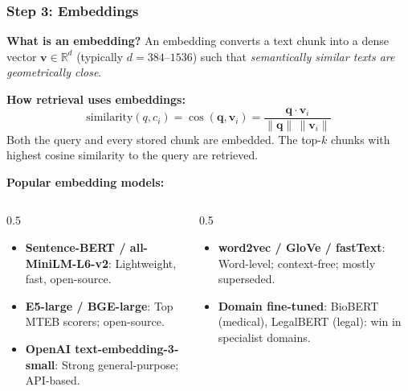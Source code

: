 \begin{frame}[fragile]\frametitle{Step 3: Embeddings}

\textbf{What is an embedding?}
An embedding converts a text chunk into a dense vector $\mathbf{v} \in \mathbb{R}^d$ (typically $d = 384$--$1536$) such that \textit{semantically similar texts are geometrically close}.

\vspace{0.3em}
\textbf{How retrieval uses embeddings:}
\[
  \text{similarity}(q, c_i) = \cos(\mathbf{q}, \mathbf{v}_i)
    = \frac{\mathbf{q} \cdot \mathbf{v}_i}{\|\mathbf{q}\|\,\|\mathbf{v}_i\|}
\]
Both the query and every stored chunk are embedded. The top-$k$ chunks with highest cosine similarity to the query are retrieved.

\vspace{0.3em}
\textbf{Popular embedding models:}
\begin{columns}
  \begin{column}[T]{0.5\linewidth}
    \begin{itemize}
      \item \textbf{Sentence-BERT / all-MiniLM-L6-v2}: Lightweight, fast, open-source.
      \item \textbf{E5-large / BGE-large}: Top MTEB scorers; open-source.
      \item \textbf{OpenAI text-embedding-3-small}: Strong general-purpose; API-based.
    \end{itemize}
  \end{column}
  \begin{column}[T]{0.5\linewidth}
    \begin{itemize}
      \item \textbf{word2vec / GloVe / fastText}: Word-level; context-free; mostly superseded.
      \item \textbf{Domain fine-tuned}: BioBERT (medical), LegalBERT (legal): win in specialist domains.
    \end{itemize}
  \end{column}
\end{columns}

\end{frame}

